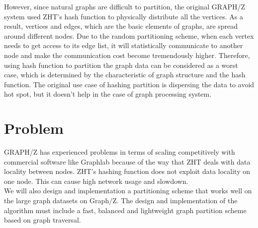 \documentclass[10pt]{article}
\begin{document}
\begin{multicols}{2}
  However, since natural graphs are difficult to partition, the original GRAPH/Z system used ZHT’s hash function to physically distribute all the vertices. As a result, vertices and edges, which are the basic elements of graphs, are spread around different nodes. Due to the random partitioning scheme, when each vertex needs to get access to its edge list, it will statistically communicate to another node and make the communication cost become tremendously higher. Therefore, using hash function to partition the graph data can be considered as a worst case, which is determined by the characteristic of graph structure and the hash function. The original use case of hashing partition is dispersing the data to avoid hot spot, but it doesn’t help in the case of graph processing system.
  
  \section{Problem}
  GRAPH/Z has experienced problems in terms of scaling competitively with commercial software like Graphlab because of the way that ZHT deals with data locality between nodes. ZHT's hashing function does not exploit data locality on one node.\cite{Gz:3} This can cause high network usage and slowdown.\\
  We will also design and implementation a partitioning scheme that works well on the large graph datasets on Graph/Z. The design and implementation of the algorithm must include a fast, balanced and lightweight graph partition scheme based on graph traversal.

\end{multicols}
\end{document}
